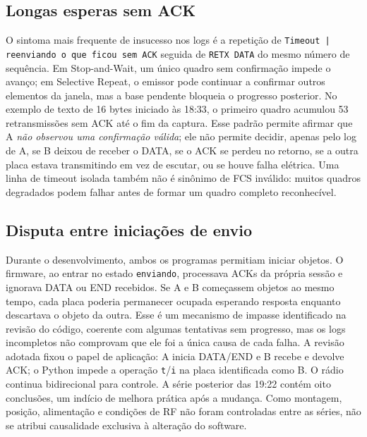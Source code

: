 \documentclass[12pt,a4paper]{article}
\begin{document}
\subsection{Longas esperas sem ACK}
O sintoma mais frequente de insucesso nos logs é a repetição de \texttt{Timeout | reenviando o que ficou sem ACK} seguida de \texttt{RETX DATA} do mesmo número de sequência. Em Stop-and-Wait, um único quadro sem confirmação impede o avanço; em Selective Repeat, o emissor pode continuar a confirmar outros elementos da janela, mas a base pendente bloqueia o progresso posterior. No exemplo de texto de 16 bytes iniciado às 18:33, o primeiro quadro acumulou 53 retransmissões sem ACK até o fim da captura. Esse padrão permite afirmar que A \emph{não observou uma confirmação válida}; ele não permite decidir, apenas pelo log de A, se B deixou de receber o DATA, se o ACK se perdeu no retorno, se a outra placa estava transmitindo em vez de escutar, ou se houve falha elétrica. Uma linha de timeout isolada também não é sinônimo de FCS inválido: muitos quadros degradados podem falhar antes de formar um quadro completo reconhecível.

\subsection{Disputa entre iniciações de envio}
Durante o desenvolvimento, ambos os programas permitiam iniciar objetos. O firmware, ao entrar no estado \texttt{enviando}, processava ACKs da própria sessão e ignorava DATA ou END recebidos. Se A e B começassem objetos ao mesmo tempo, cada placa poderia permanecer ocupada esperando resposta enquanto descartava o objeto da outra. Esse é um mecanismo de impasse identificado na revisão do código, coerente com algumas tentativas sem progresso, mas os logs incompletos não comprovam que ele foi a única causa de cada falha. A revisão adotada fixou o papel de aplicação: A inicia DATA/END e B recebe e devolve ACK; o Python impede a operação \texttt{t}/\texttt{i} na placa identificada como B. O rádio continua bidirecional para controle. A série posterior das 19:22 contém oito conclusões, um indício de melhora prática após a mudança. Como montagem, posição, alimentação e condições de RF não foram controladas entre as séries, não se atribui causalidade exclusiva à alteração do software.
\end{document}
